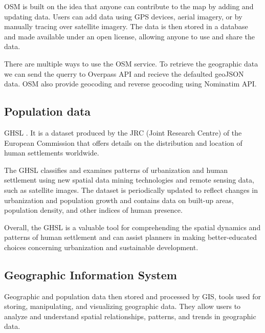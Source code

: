 \documentclass[12pt]{report}
\begin{document}
            OSM is built on the idea that anyone can contribute to the map by adding and updating data. Users can add
            data using \ac{GPS} devices, aerial imagery, or by manually tracing over satellite imagery. The data is then
            stored in a database and made available under an open license, allowing anyone to use and share the data.

            There are multiple ways to use the OSM service. To retrieve the geographic data we can send the querry to
            Overpass \ac{API} and recieve the defaulted \ac{geoJSON} data. OSM also provide geocoding and reverse geocoding using
            Nominatim API.

        \subsection{Population data}
            GHSL \cite{noauthor_global_2023}. It is a dataset produced by the JRC (Joint Research Centre) of the European Commission that
            offers details on the distribution and location of human settlements worldwide.

            The GHSL classifies and examines patterns of urbanization and human settlement using new spatial data mining
            technologies and remote sensing data, such as satellite images. The dataset is periodically updated to
            reflect changes in urbanization and population growth and contains data on built-up areas, population
            density, and other indices of human presence.

            Overall, the GHSL is a valuable tool for comprehending the spatial dynamics and patterns of human settlement
            and can assist planners in making better-educated choices concerning urbanization and sustainable
            development.

        \subsection{Geographic Information System}
            Geographic and population data then stored and processed by \ac{GIS}, tools used
            for storing, manipulating, and visualizing geographic data. They allow users to analyze and understand spatial
            relationships, patterns, and trends in geographic data. 
            
\end{document}
